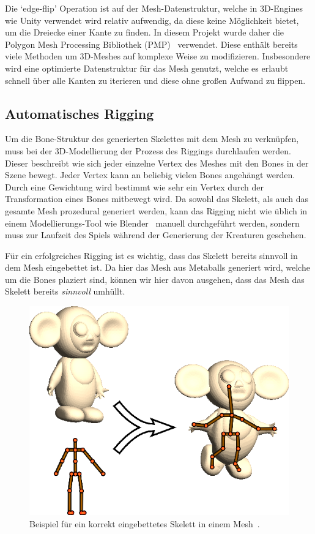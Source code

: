 Die `edge-flip' Operation ist auf der Mesh-Datenstruktur, welche in 3D-Engines wie Unity verwendet wird relativ aufwendig, da diese keine Möglichkeit bietet, um die Dreiecke einer Kante zu finden. In diesem Projekt wurde daher die Polygon Mesh Processing Bibliothek (PMP)~\cite{pmp-library} verwendet. Diese enthält bereits viele Methoden um 3D-Meshes auf komplexe Weise zu modifizieren. Insbesondere wird eine optimierte Datenstruktur für das Mesh genutzt, welche es erlaubt schnell über alle Kanten zu iterieren und diese ohne großen Aufwand zu flippen.

\subsection{Automatisches Rigging}
Um die Bone-Struktur des generierten Skelettes mit dem Mesh zu verknüpfen, muss bei der 3D-Modellierung der Prozess des Riggings durchlaufen werden. Dieser beschreibt wie sich jeder einzelne Vertex des Meshes mit den Bones in der Szene bewegt. Jeder Vertex kann an beliebig vielen Bones angehängt werden. Durch eine Gewichtung wird bestimmt wie sehr ein Vertex durch der Transformation eines Bones mitbewegt wird.
Da sowohl das Skelett, als auch das gesamte Mesh prozedural generiert werden, kann das Rigging nicht wie üblich in einem Modellierungs-Tool wie Blender~\cite{blender} manuell durchgeführt werden, sondern muss zur Laufzeit des Spiels während der Generierung der Kreaturen geschehen.

Für ein erfolgreiches Rigging ist es wichtig, dass das Skelett bereits sinnvoll in dem Mesh eingebettet ist. Da hier das Mesh aus Metaballs generiert wird, welche um die Bones plaziert sind, können wir hier davon ausgehen, dass das Mesh das Skelett bereits \emph{sinnvoll} umhüllt.

\begin{figure}[h!]
	\centering
	\includegraphics[width=0.6\linewidth]{resources/img/skeleton_embedding.png}
	\caption{Beispiel für ein korrekt eingebettetes Skelett in einem Mesh~\cite{bone_heat_paper}.}
	\label{fig:skeleton_embedding}
\end{figure}


